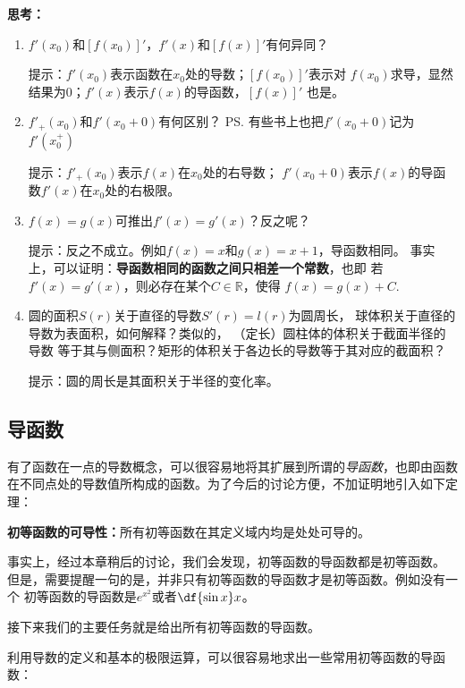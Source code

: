 \bs
{\bf 思考：}
\begin{enumerate} 
  \setlength{\itemindent}{1cm}
  \item $f'(x_0)$和$[f(x_0)]'$，$f'(x)$和$[f(x)]'$有何异同？

  \ifhint
  \quad 提示：$f'(x_0)$表示函数在$x_0$处的导数；$[f(x_0)]'$表示对
  $f(x_0)$求导，显然结果为$0$；$f'(x)$表示$f(x)$的导函数，$[f(x)]'$
  也是。
  \fi
  \item $f'_+(x_0)$和$f'(x_0+0)$有何区别？
  \ps{有些书上也把$f'(x_0+0)$记为$f'(x_0^+)$}

  \ifhint
  \quad 提示：$f'_+(x_0)$表示$f(x)$在$x_0$处的右导数；
  $f'(x_0+0)$表示$f(x)$的导函数$f'(x)$在$x_0$处的右极限。
  \fi
  \item $f(x)=g(x)$可推出$f'(x)=g'(x)$？反之呢？

  \ifhint
  \quad 提示：反之不成立。例如$f(x)=x$和$g(x)=x+1$，导函数相同。
  事实上，可以证明：{\bf 导函数相同的函数之间只相差一个常数}，也即
  若$f'(x)=g'(x)$，则必存在某个$C\in\mathbb{R}$，使得
  $f(x)=g(x)+C$.
  \fi
  \item 圆的面积$S(r)$关于直径的导数$S'(r)=l(r)$为圆周长，
  球体积关于直径的导数为表面积，如何解释？类似的，
  （定长）圆柱体的体积关于截面半径的导数
  等于其与侧面积？矩形的体积关于各边长的导数等于其对应的截面积？

  \ifhint
  \quad 提示：圆的周长是其面积关于半径的变化率。
  \fi
\end{enumerate}

\subsection{导函数}

有了函数在一点的导数概念，可以很容易地将其扩展到所谓的{\it 导函数}，也即由函数
在不同点处的导数值所构成的函数。为了今后的讨论方便，不加证明地引入如下定理：

\begin{thx}
	{\bf 初等函数的可导性：}所有初等函数在其定义域内均是处处可导的。
\end{thx}

事实上，经过本章稍后的讨论，我们会发现，初等函数的导函数都是初等函数。
但是，需要提醒一句的是，并非只有初等函数的导函数才是初等函数。例如没有一个
初等函数的导函数是$e^{x^2}$或者$\df{\sin x}x$。

接下来我们的主要任务就是给出所有初等函数的导函数。

利用导数的定义和基本的极限运算，可以很容易地求出一些常用初等函数的导函数：

